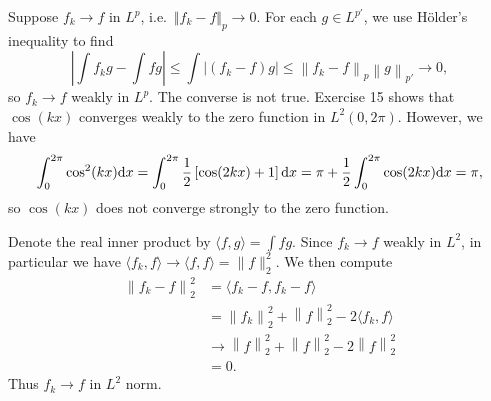 \begin{exercise}{8.16}
  Suppose $f_k \rightarrow f$ in $L^p$,
  i.e.\ $\Vert f_k - f \Vert_p \rightarrow 0$.
  For each $g \in L^{p'}$, we use H\"{o}lder's inequality to find
  \[
    \left| \int f_k g - \int f g \right|
    \le \int \left| (f_k - f) g \right|
    \le \left\| f_k - f \right\|_p \left\| g \right\|_{p'}
    \rightarrow 0,
  \]
  so $f_k \rightarrow f$ weakly in $L^p$.
  The converse is not true.
  Exercise 15 shows that $\cos(kx)$
  converges weakly to the zero function in $L^2(0, 2\pi)$.
  However, we have
  \[
    \int_0^{2\pi} \cos^2(kx) \mathrm{d} x
    = \int_0^{2\pi} \frac{1}{2} \left[ \cos(2kx) + 1 \right] \mathrm{d} x
    = \pi + \frac{1}{2} \int_0^{2\pi} \cos(2kx) \mathrm{d} x
    = \pi,
  \]
  so $\cos(kx)$ does not converge strongly to the zero function.
\end{exercise}

\begin{exercise}{8.17}
  Denote the real inner product by $\langle f, g \rangle = \int fg$.
  Since $f_k \rightarrow f$ weakly in $L^2$,
  in particular we have
  $\langle f_k, f \rangle \rightarrow \langle f, f \rangle = \| f \|_2^2$.
  We then compute
  \[
    \begin{aligned}
      \left\| f_k - f \right\|_2^2
      &= \langle f_k - f, f_k - f \rangle \\
      &= \left\| f_k \right\|_2^2 + \left\| f \right\|_2^2
      - 2 \langle f_k, f \rangle \\
      &\rightarrow \left\| f \right\|_2^2 + \left\| f \right\|_2^2
      - 2 \left\| f \right\|_2^2 \\
      &= 0.
    \end{aligned}
  \]
  Thus $f_k \rightarrow f$ in $L^2$ norm.
\end{exercise}
